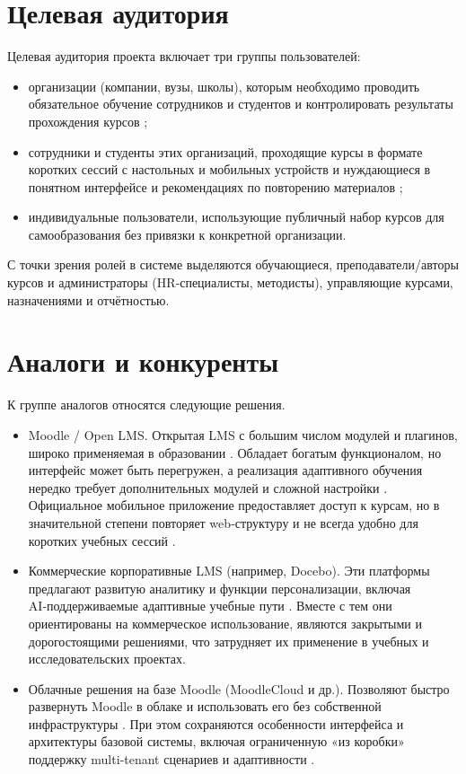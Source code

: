 \documentclass{G7-32}
\begin{document}
\section{Целевая аудитория}

Целевая аудитория проекта включает три группы пользователей:

\begin{itemize}
  \item организации (компании, вузы, школы), которым необходимо проводить обязательное обучение сотрудников и студентов и контролировать результаты прохождения курсов \cite{openlms,mobile-lms-features};
  \item сотрудники и студенты этих организаций, проходящие курсы в формате коротких сессий с настольных и мобильных устройств и нуждающиеся в понятном интерфейсе и рекомендациях по повторению материалов \cite{mobile-learning-trends,docebo-adaptive};
  \item индивидуальные пользователи, использующие публичный набор курсов для самообразования без привязки к конкретной организации.
\end{itemize}

С точки зрения ролей в системе выделяются обучающиеся, преподаватели/авторы курсов и администраторы (HR‑специалисты, методисты), управляющие курсами, назначениями и отчётностью.

\section{Аналоги и конкуренты}

К группе аналогов относятся следующие решения.

\begin{itemize}
  \item Moodle / Open LMS. Открытая LMS с большим числом модулей и плагинов, широко применяемая в образовании \cite{moodle,openlms}. Обладает богатым функционалом, но интерфейс может быть перегружен, а реализация адаптивного обучения нередко требует дополнительных модулей и сложной настройки \cite{adaptive-edu}. Официальное мобильное приложение предоставляет доступ к курсам, но в значительной степени повторяет web‑структуру и не всегда удобно для коротких учебных сессий \cite{moodleapp,moodlecloud}.
  \item Коммерческие корпоративные LMS (например, Docebo). Эти платформы предлагают развитую аналитику и функции персонализации, включая AI‑поддерживаемые адаптивные учебные пути \cite{docebo-adaptive}. Вместе с тем они ориентированы на коммерческое использование, являются закрытыми и дорогостоящими решениями, что затрудняет их применение в учебных и исследовательских проектах.
  \item Облачные решения на базе Moodle (MoodleCloud и др.). Позволяют быстро развернуть Moodle в облаке и использовать его без собственной инфраструктуры \cite{moodlecloud}. При этом сохраняются особенности интерфейса и архитектуры базовой системы, включая ограниченную «из коробки» поддержку multi‑tenant сценариев и адаптивности \cite{multitenant-moodle}.
\end{itemize}
\end{document}
